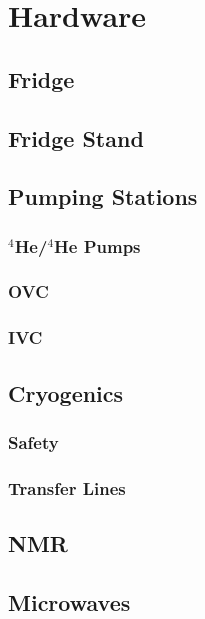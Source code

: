 \chapter{Hardware}
\label{hardware} 
\section{Fridge}

\section{Fridge Stand}

\section{Pumping Stations}
  \subsection{$^4$He/$^4$He Pumps}
  \subsection{OVC}
  \subsection{IVC}

\section{Cryogenics}
  \subsection{Safety}
  \subsection{Transfer Lines}

\section{NMR}

\section{Microwaves}